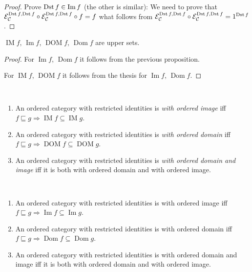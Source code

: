 \begin{proof}
Prove $\operatorname{Dst} f\in\operatorname{Im} f$ (the other is similar):
We need to prove that $\mathcal{E}_{\mathcal{C}}^{\operatorname{Dst} f, \operatorname{Dst} f} \circ \mathcal{E}_{\mathcal{C}}^{\operatorname{Dst} f,
\operatorname{Dst} f} \circ f = f$ what follows from
$\mathcal{E}_{\mathcal{C}}^{\operatorname{Dst} f, \operatorname{Dst} f} \circ \mathcal{E}_{\mathcal{C}}^{\operatorname{Dst} f, \operatorname{Dst} f} = 1^{\operatorname{Dst} f}$.
\end{proof}

\begin{prop}
$\operatorname{IM}f$, $\operatorname{Im}f$,
$\operatorname{DOM}f$, $\operatorname{Dom}f$
are upper sets.
\end{prop}

\begin{proof}
For $\operatorname{Im}f$, $\operatorname{Dom}f$ it follows
from the previous proposition.

For $\operatorname{IM}f$, $\operatorname{DOM}f$ it follows
from the thesis for
$\operatorname{Im}f$, $\operatorname{Dom}f$.
\end{proof}

\begin{defn}
~
\begin{enumerate}
\item An ordered category with restricted identities is
\emph{with ordered image} iff $f\sqsubseteq g\Rightarrow
\operatorname{IM}f\subseteq\operatorname{IM}g$.
\item An ordered category with restricted identities is
\emph{with ordered domain} iff $f\sqsubseteq g\Rightarrow
\operatorname{DOM}f\subseteq\operatorname{DOM}g$.
\item An ordered category with restricted identities is
\emph{with ordered domain and image} iff it is both
with ordered domain and with ordered image.
\end{enumerate}
\end{defn}

\begin{obvious}
~
\begin{enumerate}
\item An ordered category with restricted identities is
with ordered image iff $f\sqsubseteq g\Rightarrow
\operatorname{Im}f\subseteq\operatorname{Im}g$.
\item An ordered category with restricted identities is
with ordered domain iff $f\sqsubseteq g\Rightarrow
\operatorname{Dom}f\subseteq\operatorname{Dom}g$.
\item An ordered category with restricted identities is
with ordered domain and image iff it is both
with ordered domain and with ordered image.
\end{enumerate}
\end{obvious}

